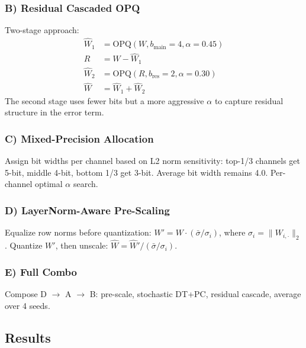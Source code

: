 \subsubsection{B) Residual Cascaded OPQ}
Two-stage approach:
\begin{align}
\hat{W}_1 &= \text{OPQ}(W, b_{\text{main}}=4, \alpha=0.45) \\
R &= W - \hat{W}_1 \\
\hat{W}_2 &= \text{OPQ}(R, b_{\text{res}}=2, \alpha=0.30) \\
\hat{W} &= \hat{W}_1 + \hat{W}_2
\end{align}
The second stage uses fewer bits but a more aggressive $\alpha$ to
capture residual structure in the error term.

\subsubsection{C) Mixed-Precision Allocation}
Assign bit widths per channel based on L2 norm sensitivity:
top-1/3 channels get 5-bit, middle 4-bit, bottom 1/3 get 3-bit.
Average bit width remains 4.0. Per-channel optimal $\alpha$ search.

\subsubsection{D) LayerNorm-Aware Pre-Scaling}
Equalize row norms before quantization: $W' = W \cdot (\bar{\sigma} / \sigma_i)$,
where $\sigma_i = \|W_{i,\cdot}\|_2$. Quantize $W'$, then unscale:
$\hat{W} = \hat{W}' / (\bar{\sigma} / \sigma_i)$.

\subsubsection{E) Full Combo}
Compose D $\rightarrow$ A $\rightarrow$ B: pre-scale, stochastic DT+PC,
residual cascade, average over 4 seeds.

\subsection{Results}

